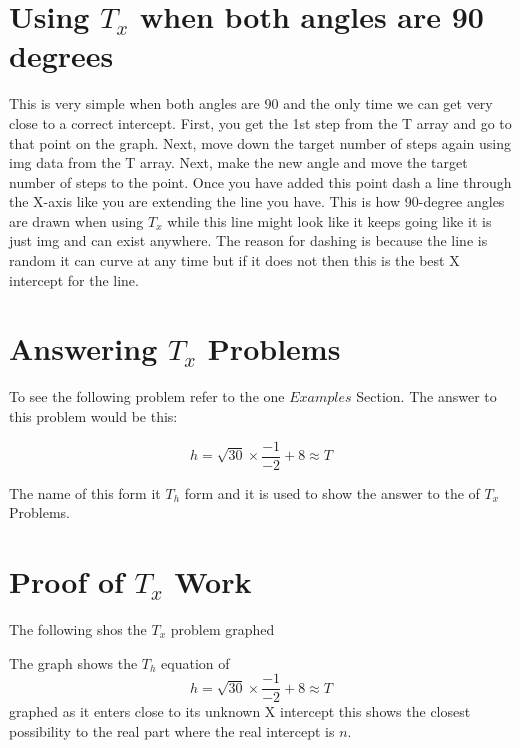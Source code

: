 \documentclass{article}
\begin{document}
 \section{Using \(T_x\) when both angles are 90 degrees}
 This is very simple when both angles are 90 and the only time we can get very close to a correct intercept. First, you get the 1st step from the T array and go to that point on the graph. Next, move down the target number of steps again using img data from the T array. Next, make the new angle and move the target number of steps to the point. Once you have added this point dash a line through the X-axis like you are extending the line you have. This is how 90-degree angles are drawn when using \(T_x\) while this line might look like it keeps going like it is just img and can exist anywhere. The reason for dashing is because the line is random it can curve at any time but if it does not then this is the best X intercept for the line.


\section{Answering \(T_x\) Problems}
To see the following problem refer to the one \(Examples\) Section. The answer to this problem would be this:

\[
 h = \sqrt{30} \times \frac{-1}{-2} + 8 \approx T 
\]

The name of this form it \(T_h\) form and it is used to show the answer to the of \(T_x\) Problems.


\section{Proof of \(T_x\) Work}
The following shos the \(T_x\) problem graphed 




The graph shows the \(T_h\) equation of 
\[
 h = \sqrt{30} \times \frac{-1}{-2} + 8 \approx T 
\]
 graphed as it enters close to its unknown X intercept this shows the closest possibility to the real part where the real intercept is \(n\). 
\end{document}
